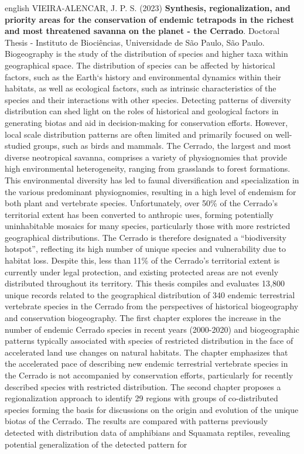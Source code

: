 \documentclass[12pt,openright,oneside,a4paper,english]{abntex2}
\begin{document}
\begin{resumo}[Abstract]
	\begin{otherlanguage*}{english}
		VIEIRA-ALENCAR, J. P. S. (2023) \textbf{Synthesis, regionalization, and priority areas for the conservation of endemic tetrapods in the richest and most threatened savanna on the planet - the Cerrado}. Doctoral Thesis - Instituto de Biociências, Universidade de São Paulo, São Paulo.\\
		
		Biogeography is the study of the distribution of species and higher taxa within geographical space. The distribution of species can be affected by historical factors, such as the Earth‘s history and environmental dynamics within their habitats, as well as ecological factors, such as intrinsic characteristics of the species and their interactions with other species. Detecting patterns of diversity distribution can shed light on the roles of historical and geological factors in generating biotas and aid in decision-making for conservation efforts. However, local scale distribution patterns are often limited and primarily focused on well-studied groups, such as birds and mammals. The Cerrado, the largest and most diverse neotropical savanna, comprises a variety of physiognomies that provide high environmental heterogeneity, ranging from grasslands to forest formations. This environmental diversity has led to faunal diversification and specialization in the various predominant physiognomies, resulting in a high level of endemism for both plant and vertebrate species. Unfortunately, over 50\% of the Cerrado’s territorial extent has been converted to anthropic uses, forming potentially uninhabitable mosaics for many species, particularly those with more restricted geographical distributions. The Cerrado is therefore designated a “biodiversity hotspot”, reflecting its high number of unique species and vulnerability due to habitat loss. Despite this, less than 11\% of the Cerrado’s territorial extent is currently under legal protection, and existing protected areas are not evenly distributed throughout its territory. This thesis compiles and evaluates 13,800 unique records related to the geographical distribution of 340 endemic terrestrial vertebrate species in the Cerrado from the perspectives of historical biogeography and conservation biogeography. The first chapter explores the increase in the number of endemic Cerrado species in recent years (2000-2020) and biogeographic patterns typically associated with species of restricted distribution in the face of accelerated land use changes on natural habitats. The chapter emphasizes that the accelerated pace of describing new endemic terrestrial vertebrate species in the Cerrado is not accompanied by conservation efforts, particularly for recently described species with restricted distribution. The second chapter proposes a regionalization approach to identify 29 regions with groups of co-distributed species forming the basis for discussions on the origin and evolution of the unique biotas of the Cerrado. The results are compared with patterns previously detected with distribution data of amphibians and Squamata reptiles, revealing potential generalization of the detected pattern for 
\end{otherlanguage*}
\end{resumo}
\end{document}
